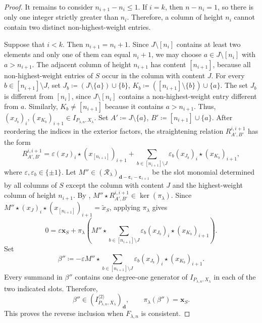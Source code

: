 \documentclass[a4paper,reqno]{amsart}
\theoremstyle{plainnopunct}
\theoremstyle{definitionnopunct}
\newcommand{\cR}{\mathcal{R}}
\newcommand{\bx}{\mathbf{x}}
\newcommand{\bd}{\mathbf{d}}
\newcommand{\bepsilon}{\boldsymbol{\varepsilon}}
\begin{document}
\begin{proof}
It remains to consider $n_{i+1}-n_i\leq1$.
If $i=k$, then $n-n_i=1$,
so there is only one integer strictly greater than $n_i$. Therefore,
a column of height $n_i$ cannot contain two distinct
non-highest-weight entries.

Suppose that $i<k$. Then
$n_{i+1}=n_i+1$.
Since $J\setminus[n_i]$ contains at least two elements and only one of
them can equal $n_i+1$, we may choose
$a\in J\setminus[n_i]$ with
$a>n_{i+1}$.
The adjacent column of height $n_{i+1}$ has content $[n_{i+1}]$,
because all non-highest-weight entries of $S$ occur in the column
with content $J$. For every $b\in[n_{i+1}]\setminus J$,
set
$J_b
\coloneq
(J\setminus\{a\})\cup\{b\}$, $K_b
\coloneq
([n_{i+1}]\setminus\{b\})\cup\{a\}$.
The set $J_b$ is different from $[n_i]$, since
$J\setminus[n_i]$ contains a non-highest-weight entry different from
$a$. Similarly,
$K_b\neq[n_{i+1}]
$
because it contains $a>n_{i+1}$. Thus,
$(x_{J_b})_i,
(x_{K_b})_{i+1}
\in
I_{P_{\lambda,n},X_\lambda}$. Set $A'
\coloneq
J\setminus\{a\}$, $B'
\coloneq
[n_{i+1}]\cup\{a\}$.
After reordering the indices in the exterior factors, the
straightening relation
$R_{A',B'}^{i,i+1}$ has the form
\[
R_{A',B'}^{i,i+1}
=
\varepsilon
(x_J)_i\star(x_{[n_{i+1}]})_{i+1}
+
\sum_{b\in[n_{i+1}]\setminus J}
\varepsilon_b
(x_{J_b})_i\star(x_{K_b})_{i+1},
\]
where $\varepsilon,\varepsilon_b\in\{\pm1\}$. Let $M''
\in
(\cR_\lambda)_{\bd-\bepsilon_i-\bepsilon_{i+1}}$
be the slot monomial determined by all columns of $S$ except the
column with content $J$ and the highest-weight column of height
$n_{i+1}$. By
,
 $M''\star R_{A',B'}^{i,i+1}
\in
\ker(\pi_\lambda)$.
Since
$
M''
\star
(x_J)_i
\star
(x_{[n_{i+1}]})_{i+1}
=
\widetilde{x}_S$,
applying $\pi_\lambda$ gives
\[
0
=
\varepsilon\bx_S
+
\pi_\lambda
\left(
M''
\star
\sum_{b\in[n_{i+1}]\setminus J}
\varepsilon_b
(x_{J_b})_i\star(x_{K_b})_{i+1}
\right).
\] 
Set
\[
\beta''
\coloneq
-\varepsilon
M''
\star
\sum_{b\in[n_{i+1}]\setminus J}
\varepsilon_b
(x_{J_b})_i\star(x_{K_b})_{i+1}.
\]
Every summand in $\beta''$ contains one degree-one generator of
$I_{P_{\lambda,n},X_\lambda}$ in each of the two indicated slots.
Therefore,
\[
\beta''
\in
\left(
I_{P_{\lambda,n},X_\lambda}^{\langle2\rangle}
\right)_{\bd},
\qquad
\pi_\lambda(\beta'')=\bx_S.
\]
This proves the reverse inclusion when $F_{\lambda,n}$ is consistent.


\end{proof}
\end{document}
